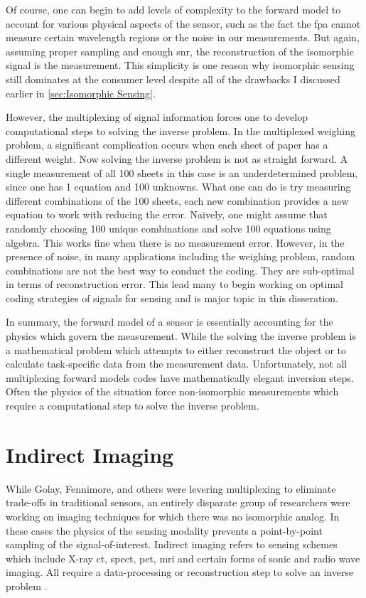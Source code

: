 Of course, one can begin to add levels of complexity to the forward model to account for various physical aspects of the sensor, such as the fact the \gls{fpa} cannot measure certain wavelength regions or the noise in our measurements. But again, assuming proper sampling and enough \gls{snr}, the reconstruction of the isomorphic signal is the measurement. This simplicity is one reason why isomorphic sensing still dominates at the consumer level despite all of the drawbacks I discussed earlier in \autoref{sec:Isomorphic Sensing}. 

However, the multiplexing of signal information forces one to develop computational steps to solving the inverse problem. In the multiplexed weighing problem, a significant complication occurs when each sheet of paper has a different weight. Now solving the inverse problem is not as straight forward. A single measurement of all 100 sheets in this case is an underdetermined problem, since one has 1 equation and 100 unknowns. What one can do is try measuring different combinations of the 100 sheets, each new combination provides a new equation to work with reducing the error. Naively, one might assume that randomly choosing 100 unique combinations and solve 100 equations using algebra. This works fine when there is no measurement error. However, in the presence of noise, in many applications including the weighing problem, random combinations are not the best way to conduct the coding. They are sub-optimal in terms of reconstruction error. This lead many to begin working on optimal coding strategies of signals for sensing and is major topic in this disseration.

In summary, the forward model of a sensor is essentially accounting for the physics which govern the measurement. While the solving the inverse problem is a mathematical problem which attempts to either reconstruct the object or to calculate task-specific data from the measurement data. Unfortunately, not all multiplexing forward models codes have mathematically elegant inversion steps. Often the physics of the situation force non-isomorphic measurements which require a computational step to solve the inverse problem. 

\section{Indirect Imaging}

While Golay, Fennimore, and others were levering multiplexing to eliminate trade-offs in traditional sensors, an entirely disparate group of researchers were working on imaging techniques for which there was no isomorphic analog. In these cases the physics of the sensing modality prevents a point-by-point sampling of the signal-of-interest. Indirect imaging refers to sensing schemes which include X-ray \gls{ct}, \gls{spect}, \gls{pet}, \gls{mri} and certain forms of sonic and radio wave imaging. All require a data-processing or reconstruction step to solve an inverse problem \cite{barrett2013foundations}. 

